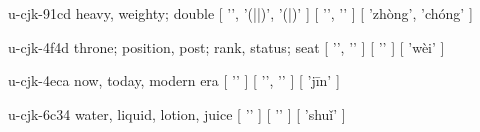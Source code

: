 \begin{multicols}{2}
\lettrine[lines=3]{\cjkgGlue{}}{}\begin{minipage}{0.8\linewidth} u-cjk-91cd  heavy, weighty; double  [ '\cjkgGlue{}', '\cjkgGlue{}(\cjkgGlue{}|\cjkgGlue{}|\cjkgGlue{})', '\cjkgGlue{}(\cjkgGlue{}|\cjkgGlue{})' ]  [ '\cjkgGlue{}', '\cjkgGlue{}' ]  [ 'zhòng', 'chóng' ] \end{minipage}

\lettrine[lines=3]{\cjkgGlue{}}{}\begin{minipage}{0.8\linewidth} u-cjk-4f4d  throne; position, post; rank, status; seat  [ '\cjkgGlue{}', '\cjkgGlue{}' ]  [ '\cjkgGlue{}' ]  [ 'wèi' ] \end{minipage}

\lettrine[lines=3]{\cjkgGlue{}}{}\begin{minipage}{0.8\linewidth} u-cjk-4eca  now, today, modern era  [ '\cjkgGlue{}' ]  [ '\cjkgGlue{}', '\cjkgGlue{}' ]  [ 'jīn' ] \end{minipage}

\lettrine[lines=3]{\cjkgGlue{}}{}\begin{minipage}{0.8\linewidth} u-cjk-6c34  water, liquid, lotion, juice  [ '\cjkgGlue{}' ]  [ '\cjkgGlue{}' ]  [ 'shuǐ' ] \end{minipage}


\end{multicols}
